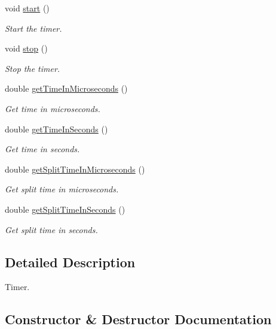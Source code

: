 \begin{DoxyCompactItemize}
void \mbox{\hyperlink{classUtil_1_1StopWatch_a87db8057d5ddf177cfcc9ae497337d13}{start}} ()
\begin{DoxyCompactList}\small\item\em Start the timer. \end{DoxyCompactList}\item 
void \mbox{\hyperlink{classUtil_1_1StopWatch_a8a89a1d02ece7c671ee1d9e9f42c88b2}{stop}} ()
\begin{DoxyCompactList}\small\item\em Stop the timer. \end{DoxyCompactList}\item 
double \mbox{\hyperlink{classUtil_1_1StopWatch_ab4de18812edf2336f96c52afcb0386b6}{get\+Time\+In\+Microseconds}} ()
\begin{DoxyCompactList}\small\item\em Get time in microseconds. \end{DoxyCompactList}\item 
double \mbox{\hyperlink{classUtil_1_1StopWatch_ab0bc68fe69855bd73f27cd8f4fa0a8c4}{get\+Time\+In\+Seconds}} ()
\begin{DoxyCompactList}\small\item\em Get time in seconds. \end{DoxyCompactList}\item 
double \mbox{\hyperlink{classUtil_1_1StopWatch_a5901023b831c6670d4184a9c6e85ff75}{get\+Split\+Time\+In\+Microseconds}} ()
\begin{DoxyCompactList}\small\item\em Get split time in microseconds. \end{DoxyCompactList}\item 
double \mbox{\hyperlink{classUtil_1_1StopWatch_aa0934b52920e4075317c6176675efb95}{get\+Split\+Time\+In\+Seconds}} ()
\begin{DoxyCompactList}\small\item\em Get split time in seconds. \end{DoxyCompactList}\end{DoxyCompactItemize}


\subsection{Detailed Description}
Timer. 

\subsection{Constructor \& Destructor Documentation}
\mbox{\label{classUtil_1_1StopWatch_a7eeb59348e5efff8490d2e8e95b0f126}} 
